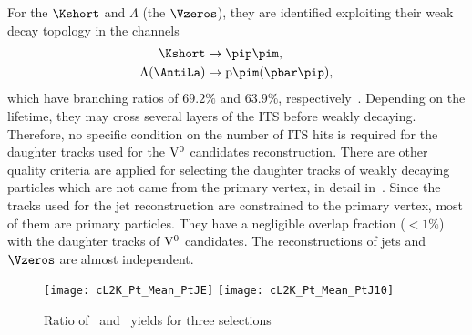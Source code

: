 For the $\Kshort$ and $\Lambda$ (the $\Vzeros$),
they are identified exploiting their weak decay topology in the channels
\begin{equation}
\begin{split}
\Kshort & \to  \pip\pim, \\
\Lambda (\AntiLa) & \to {\rm p}\pim (\pbar\pip),
\end{split}
\end{equation}
which have branching ratios of $69.2\%$ and $63.9\%$,
respectively~\cite{Beringer:1900zz}.
Depending on the lifetime,
they may cross several layers of the ITS before weakly decaying.
Therefore, no specific condition on the number of ITS hits is required for
the daughter tracks used for the ${\rm V}^{0}$ candidates reconstruction.
There are other quality criteria are applied for selecting the daughter tracks of
weakly decaying particles which are not came from the primary vertex,
in detail in~\cite{Aamodt:2011zza}.
Since the tracks used for the jet reconstruction are constrained to the
primary vertex,  most of them are primary particles.
They have a negligible overlap fraction
($<1\%$)
with the daughter tracks of ${\rm V}^{0}$ candidates.
The reconstructions of jets and $\Vzeros$ are almost independent.



\begin{figure}[htbp]
   \centering
   \texttt{[image: cL2K\_Pt\_Mean\_PtJE]}
   \texttt{[image: cL2K\_Pt\_Mean\_PtJ10]}
   \caption{Ratio of \lda\ and \ks\ yields for three selections  }
   \label{fig:L2Kratio}
\end{figure}

